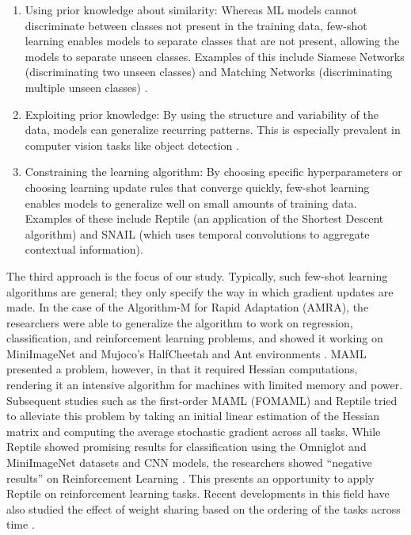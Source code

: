\documentclass[runningheads]{llncs}
\begin{document}
\begin{enumerate}
	\item Using prior knowledge about similarity: Whereas ML models cannot discriminate between classes not present in the training data, few-shot learning enables models to separate classes that are not present, allowing the models to separate unseen classes. Examples of this include Siamese Networks (discriminating two unseen classes) \cite{koch2015siamese} and Matching Networks (discriminating multiple unseen classes) \cite{vinyals2016matching}.
	
	\item Exploiting prior knowledge: By using the structure and variability of the data, models can generalize recurring patterns. This is especially prevalent in computer vision tasks like object detection \cite{lake2015human}.
	
	\item Constraining the learning algorithm: By choosing specific hyperparameters or choosing learning update rules that converge quickly, few-shot learning enables models to generalize well on small amounts of training data. Examples of these include Reptile \cite{nichol2018first} (an application of the Shortest Descent algorithm) and SNAIL \cite{mishra2017simple} (which uses temporal convolutions to aggregate contextual information). 
	
\end{enumerate}

\noindent The third approach is the focus of our study. Typically, such few-shot learning algorithms are general; they only specify the way in which gradient updates are made. In the case of the Algorithm-M for Rapid Adaptation (AMRA), the researchers were able to generalize the algorithm to work on regression, classification, and reinforcement learning problems, and showed it working on MiniImageNet and Mujoco's HalfCheetah and Ant environments \cite{finn17maml}. MAML presented a problem, however, in that it required Hessian computations, rendering it an intensive algorithm for machines with limited memory and power. Subsequent studies such as the first-order MAML (FOMAML) and Reptile tried to alleviate this problem by taking an initial linear estimation of the Hessian matrix and computing the average stochastic gradient across all tasks. While Reptile showed promising results for classification using the Omniglot and MiniImageNet datasets and CNN models, the researchers showed ``negative results” on Reinforcement Learning \cite{nichol2018first}. This presents an opportunity to apply Reptile on reinforcement learning tasks. Recent developments in this field have also studied the effect of weight sharing based on the ordering of the tasks across time \cite{riemer2019learning}.
\end{document}
